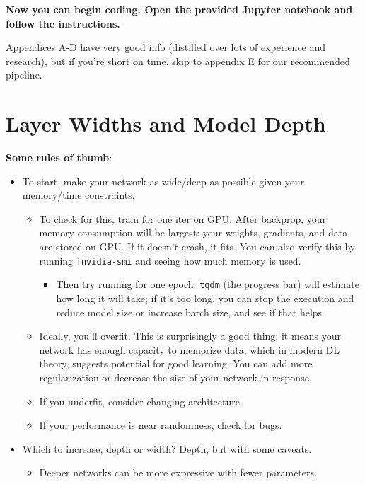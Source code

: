 \documentclass{article}
\newcommand{\ttt}[1]{\texttt{#1}}
\begin{document}
\textbf{Now you can begin coding. Open the provided Jupyter notebook and follow the instructions.} \\

\newpage

\begin{appendices}

Appendices A-D have very good info (distilled over lots of experience and research), but if you're short on time, skip to appendix E for our recommended pipeline.

\section{Layer Widths and Model Depth}

\textbf{Some rules of thumb}:
\begin{itemize}
    \item To start, make your network as wide/deep as possible given your memory/time constraints.
    \begin{itemize}
        \item To check for this, train for one iter on GPU. After backprop, your memory consumption will be largest: your weights, gradients, and data are stored on GPU. If it doesn't crash, it fits. You can also verify this by running \ttt{!nvidia-smi} and seeing how much memory is used.
        \begin{itemize}
            \item Then try running for one epoch. \ttt{tqdm} (the progress bar) will estimate how long it will take; if it's too long, you can stop the execution and reduce model size or increase batch size, and see if that helps.
        \end{itemize}
        \item Ideally, you'll overfit. This is surprisingly a good thing; it means your network has enough capacity to memorize data, which in modern DL theory, suggests potential for good learning. You can add more regularization or decrease the size of your network in response.
        \item If you underfit, consider changing architecture.
        \item If your performance is near randomness, check for bugs.
    \end{itemize}
    \item Which to increase, depth or width? Depth, but with some caveats.
    \begin{itemize}
        \item Deeper networks can be more expressive with fewer parameters.

\end{itemize}
\end{itemize}
\end{appendices}
\end{document}
